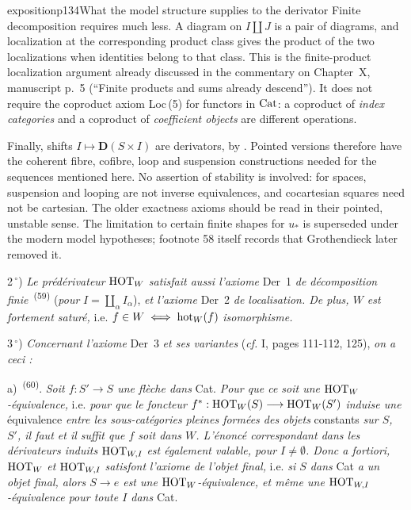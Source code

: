 \begin{dcomment}{exposition}{p134}{What the model structure supplies to the derivator}
Finite decomposition requires much less. A diagram on $I\amalg J$ is a pair of diagrams, and localization at the corresponding product class gives the product of the two localizations when identities belong to that class. This is the finite-product localization argument already discussed in the commentary on Chapter~X, manuscript p.~5 (``Finite products and sums already descend''). It does not require the coproduct axiom Loc\,(5) for functors in $\mathrm{Cat}$: a coproduct of \emph{index categories} and a coproduct of \emph{coefficient objects} are different operations.

Finally, shifts $I\mapsto\mathbf D(S\times I)$ are derivators, by \citet[Theorem 1.25]{Groth2013}. Pointed versions therefore have the coherent fibre, cofibre, loop and suspension constructions needed for the sequences mentioned here. No assertion of stability is involved: for spaces, suspension and looping are not inverse equivalences, and cocartesian squares need not be cartesian. The older exactness axioms should be read in their pointed, unstable sense. The limitation to certain finite shapes for $u_*$ is superseded under the modern model hypotheses; footnote 58 itself records that Grothendieck later removed it.
\end{dcomment}


2\,$^{\circ}$) \textit{Le prédérivateur} $\mathrm{HOT}_W$ \textit{satisfait aussi l'axiome} Der~1 \textit{de décomposition finie}~\textsuperscript{(59)} (\textit{pour} $I = \coprod_{\alpha} I_{\alpha}$), \textit{et l'axiome} Der~2 \textit{de localisation. De plus, $W$ est fortement saturé,} i.e. $f \in W \iff \mathrm{hot}_W(f)$ \textit{isomorphisme.}

3\,$^{\circ}$) \textit{Concernant l'axiome} Der~3 \textit{et ses variantes} (\textit{cf.} I, pages 111-112, 125), \textit{on a ceci :}

a)~\textsuperscript{(60)}. \textit{Soit $f : S' \longrightarrow S$ une flèche dans} Cat. \textit{Pour que ce soit une} $\mathrm{HOT}_W$\textit{-équivalence,} i.e. \textit{pour que le foncteur} $f^* : \mathrm{HOT}_W(S) \longrightarrow \mathrm{HOT}_W(S')$ \textit{induise une} équivalence \textit{entre les sous-catégories pleines formées des objets} constants \textit{sur $S$, $S'$, il faut et il suffit que $f$ soit dans $W$. L'énoncé correspondant dans les dérivateurs induits} $\mathrm{HOT}_{W,I}$ \textit{est également valable, pour $I \neq \emptyset$. Donc a fortiori,} $\mathrm{HOT}_W$ \textit{et} $\mathrm{HOT}_{W,I}$ \textit{satisfont}
\textit{l'axiome de l'objet final,} i.e. \textit{si $S$ dans} Cat \textit{a un objet final, alors $S \longrightarrow e$ est une} $\mathrm{HOT}_W$\textit{-équivalence, et même une} $\mathrm{HOT}_{W,I}$\textit{-équivalence pour toute $I$ dans} Cat.

